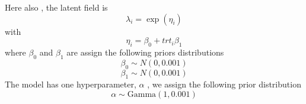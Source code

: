 \documentclass[11pt,a4paper]{article}
\begin{document}
Here also , the latent field is
\begin{displaymath}
\lambda_{i}= \exp(\eta_{i}) 
\end{displaymath}
with
\begin{displaymath} 
\eta_{i}= \beta_{0}+ trt_{i}\beta_{1} 
\end{displaymath}
where $\beta_{0}$ and $\beta_{1}$ are assign the following priors distributions
\begin{displaymath}
\beta_{0}\sim N(0,0.001)
\end{displaymath}
\begin{displaymath}
\beta_{1}\sim N(0,0.001)
\end{displaymath} 
The model has one hyperparameter, $\alpha$ , we assign the following  prior distribution
\begin{displaymath}
\alpha \sim \text{Gamma}(1, 0.001)
\end{displaymath} 
 
 
 
 
\end{document}
